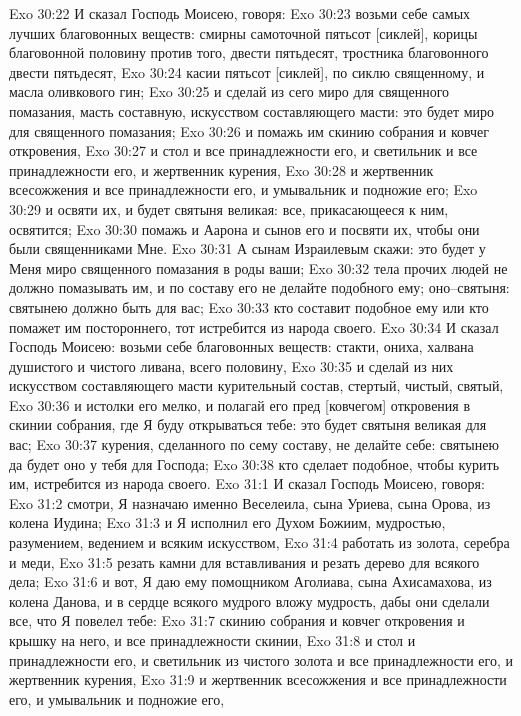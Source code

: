 Exo 30:22  И сказал Господь Моисею, говоря:
Exo 30:23  возьми себе самых лучших благовонных веществ: смирны самоточной пятьсот [сиклей], корицы благовонной половину против того, двести пятьдесят, тростника благовонного двести пятьдесят,
Exo 30:24  касии пятьсот [сиклей], по сиклю священному, и масла оливкового гин;
Exo 30:25  и сделай из сего миро для священного помазания, масть составную, искусством составляющего масти: это будет миро для священного помазания;
Exo 30:26  и помажь им скинию собрания и ковчег откровения,
Exo 30:27  и стол и все принадлежности его, и светильник и все принадлежности его, и жертвенник курения,
Exo 30:28  и жертвенник всесожжения и все принадлежности его, и умывальник и подножие его;
Exo 30:29  и освяти их, и будет святыня великая: все, прикасающееся к ним, освятится;
Exo 30:30  помажь и Аарона и сынов его и посвяти их, чтобы они были священниками Мне.
Exo 30:31  А сынам Израилевым скажи: это будет у Меня миро священного помазания в роды ваши;
Exo 30:32  тела прочих людей не должно помазывать им, и по составу его не делайте подобного ему; оно--святыня: святынею должно быть для вас;
Exo 30:33  кто составит подобное ему или кто помажет им постороннего, тот истребится из народа своего.
Exo 30:34  И сказал Господь Моисею: возьми себе благовонных веществ: стакти, ониха, халвана душистого и чистого ливана, всего половину,
Exo 30:35  и сделай из них искусством составляющего масти курительный состав, стертый, чистый, святый,
Exo 30:36  и истолки его мелко, и полагай его пред [ковчегом] откровения в скинии собрания, где Я буду открываться тебе: это будет святыня великая для вас;
Exo 30:37  курения, сделанного по сему составу, не делайте себе: святынею да будет оно у тебя для Господа;
Exo 30:38  кто сделает подобное, чтобы курить им, истребится из народа своего.
Exo 31:1  И сказал Господь Моисею, говоря:
Exo 31:2  смотри, Я назначаю именно Веселеила, сына Уриева, сына Орова, из колена Иудина;
Exo 31:3  и Я исполнил его Духом Божиим, мудростью, разумением, ведением и всяким искусством,
Exo 31:4  работать из золота, серебра и меди,
Exo 31:5  резать камни для вставливания и резать дерево для всякого дела;
Exo 31:6  и вот, Я даю ему помощником Аголиава, сына Ахисамахова, из колена Данова, и в сердце всякого мудрого вложу мудрость, дабы они сделали все, что Я повелел тебе:
Exo 31:7  скинию собрания и ковчег откровения и крышку на него, и все принадлежности скинии,
Exo 31:8  и стол и принадлежности его, и светильник из чистого золота и все принадлежности его, и жертвенник курения,
Exo 31:9  и жертвенник всесожжения и все принадлежности его, и умывальник и подножие его,
